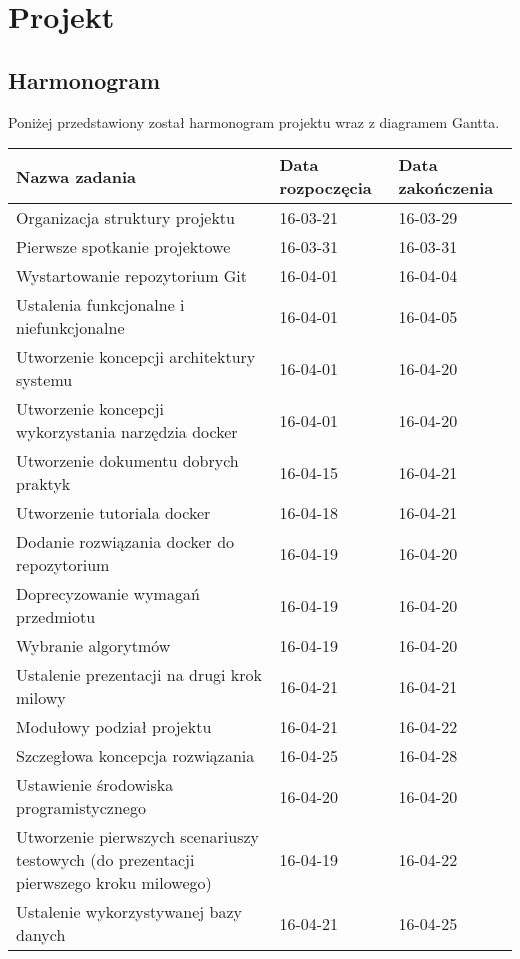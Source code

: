 \chapter{Projekt}


\section{Harmonogram}
Poniżej przedstawiony został harmonogram projektu wraz z diagramem Gantta.

  \begin{longtable}{| p{} || p{} | p{} |}
\hline
\textbf{Nazwa zadania} & \textbf{Data rozpoczęcia} & \textbf{Data zakończenia} \\ \hline
Organizacja struktury projektu & 16-03-21 & 16-03-29 \\ \hline
Pierwsze spotkanie projektowe & 16-03-31 & 16-03-31 \\ \hline
Wystartowanie repozytorium Git & 16-04-01 & 16-04-04 \\ \hline
Ustalenia funkcjonalne i niefunkcjonalne & 16-04-01 & 16-04-05 \\ \hline
Utworzenie koncepcji architektury systemu & 16-04-01 & 16-04-20 \\ \hline
Utworzenie koncepcji wykorzystania narzędzia docker & 16-04-01 & 16-04-20 \\ \hline
Utworzenie dokumentu dobrych praktyk & 16-04-15 & 16-04-21 \\ \hline
Utworzenie tutoriala docker & 16-04-18 & 16-04-21 \\ \hline
Dodanie rozwiązania docker do repozytorium & 16-04-19 & 16-04-20 \\ \hline
Doprecyzowanie wymagań przedmiotu & 16-04-19 & 16-04-20 \\ \hline
Wybranie algorytmów & 16-04-19 & 16-04-20 \\ \hline
Ustalenie prezentacji na drugi krok milowy & 16-04-21 & 16-04-21 \\ \hline
Modułowy podział projektu & 16-04-21 & 16-04-22 \\ \hline
Szczegłowa koncepcja rozwiązania & 16-04-25 & 16-04-28 \\ \hline
Ustawienie środowiska programistycznego & 16-04-20 & 16-04-20 \\ \hline
Utworzenie pierwszych scenariuszy testowych (do prezentacji pierwszego kroku milowego) & 16-04-19 & 16-04-22 \\ \hline
Ustalenie wykorzystywanej bazy danych & 16-04-21 & 16-04-25 \\ \hline

\end{longtable}

